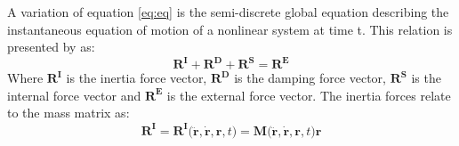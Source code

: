 \noindent A variation of equation \ref{eq:eq} is the semi-discrete global equation describing the instantaneous equation of motion of a nonlinear system at time t. This relation is presented by \cite{Mathisen1990} as:
\begin{equation}
    \boldsymbol{R^I}+ \boldsymbol{R^D} + \boldsymbol{R^S}=\boldsymbol{R^E}
\end{equation}
Where $\boldsymbol{R^I}$ is the inertia force vector, $\boldsymbol{R^D}$ is the damping force vector, $\boldsymbol{R^S}$ is the internal force vector and $\boldsymbol{R^E}$ is the external force vector. \newline
\newline
The inertia forces relate to the mass matrix as:
\begin{equation}
    \boldsymbol{R^I}= \boldsymbol{R^I(\ddot{r},\dot{r},r,}t)=\boldsymbol{M(\ddot{r},\dot{r},r,}t)\boldsymbol{r}
\end{equation}

